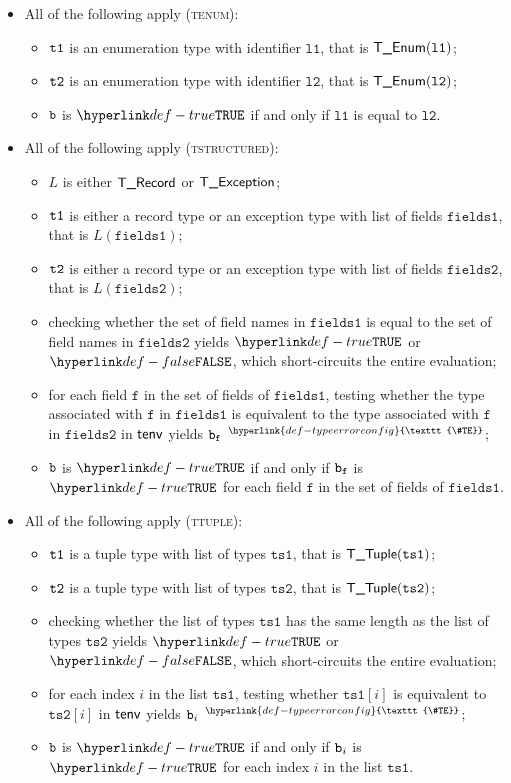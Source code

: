 \documentclass{book}
\newcommand\TypeErrorConfig[0]{\hyperlink{def-typeerrorconfig}{\texttt{\#TE}}}
\newcommand\ProseOrTypeError[0]{\hyperlink{def-proseortypeerror}{$^{\TypeErrorConfig}$}}
\newcommand\vf[0]{\texttt{f}}
\newcommand\vtsone[0]{\texttt{ts1}}
\newcommand\vtstwo[0]{\texttt{ts2}}
\newcommand\vfieldsone[0]{\texttt{fields1}}
\newcommand\vfieldstwo[0]{\texttt{fields2}}
\newcommand\vlone[0]{\texttt{l1}}
\newcommand\vltwo[0]{\texttt{l2}}
\begin{document}
\begin{itemize}
  \item All of the following apply (\textsc{tenum}):
  \begin{itemize}
    \item $\texttt{t1}$ is an enumeration type with identifier $\vlone$, that is $\TEnum(\vlone)$;
    \item $\texttt{t2}$ is an enumeration type with identifier $\vltwo$, that is $\TEnum(\vltwo)$;
    \item $\texttt{b}$ is $\True$ if and only if $\vlone$ is equal to $\vltwo$.
  \end{itemize}

  \item All of the following apply (\textsc{tstructured}):
  \begin{itemize}
    \item $L$ is either $\textsf{T\_Record}$ or $\textsf{T\_Exception}$;
    \item $\texttt{t1}$ is either a record type or an exception type with list of fields $\vfieldsone$, that is $L(\vfieldsone)$;
    \item $\texttt{t2}$ is either a record type or an exception type with list of fields $\vfieldstwo$, that is $L(\vfieldstwo)$;
    \item checking whether the set of field names in $\vfieldsone$ is equal to the set of field names in $\vfieldstwo$
          yields $\True$ or $\False$, which short-circuits the entire evaluation;
    \item for each field $\vf$ in the set of fields of $\vfieldsone$, testing whether the type associated with
          $\vf$ in $\vfieldsone$ is equivalent to the type associated with
          $\vf$ in $\vfieldstwo$ in $\textsf{tenv}$ yields $\vb_\vf$ \ProseOrTypeError;
    \item $\texttt{b}$ is $\True$ if and only if $\vb_\vf$ is $\True$ for each field $\vf$ in the set of fields of $\vfieldsone$.
  \end{itemize}

  \item All of the following apply (\textsc{ttuple}):
  \begin{itemize}
    \item $\texttt{t1}$ is a tuple type with list of types $\vtsone$, that is $\TTuple(\vtsone)$;
    \item $\texttt{t2}$ is a tuple type with list of types $\vtstwo$, that is $\TTuple(\vtstwo)$;
    \item checking whether the list of types $\vtsone$ has the same length as the list of types $\vtstwo$ yields $\True$
          or $\False$, which short-circuits the entire evaluation;
    \item for each index $i$ in the list $\vtsone$, testing whether $\vtsone[i]$ is equivalent to $\vtstwo[i]$ in $\textsf{tenv}$
          yields $\texttt{b}_i$ \ProseOrTypeError;
    \item $\texttt{b}$ is $\True$ if and only if $\texttt{b}_i$ is $\True$ for each index $i$ in the list $\vtsone$.
  \end{itemize}
\end{itemize}
\end{document}
